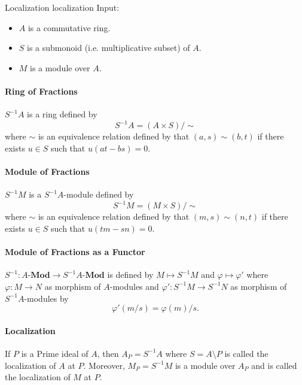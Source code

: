 \documentclass{article}
\begin{document}
\begin{definition}{Localization }{localization}
    Input:
    \begin{itemize}
        \item $A$ is a commutative ring.
        \item $S$ is a submonoid (i.e. multiplicative subset) of $A$.
        \item $M$ is a module over $A$.
    \end{itemize}
    \paragraph*{Ring of Fractions}
    $S^{-1}A$ is a ring defined by
    \[ S^{-1} A = (A\times S)/\sim \]
    where $\sim$ is an equivalence relation defined by that $(a,s) \sim (b,t)$ if there exists $u\in S$ such that $u(at - bs) = 0$.
    \paragraph*{Module of Fractions}
    $S^{-1}M$ is a $S^{-1}A$-module defined by
    \[ S^{-1}M = (M\times S) / \sim \]
    where $\sim$ is an equivalence relation defined by that $(m,s)\sim (n,t)$ if there exists $u\in S$ such that $u(tm - sn) = 0$.
    \paragraph*{Module of Fractions as a Functor}
    $S^{-1}:A\text{-}\mathbf{Mod} \rightarrow S^{-1}A\text{-}\mathbf{Mod}$ is defined by $M\mapsto S^{-1}M$ and $\varphi\mapsto \varphi'$ where $\varphi: M\rightarrow N$ as morphism of $A$-modules and $\varphi':S^{-1}M\rightarrow S^{-1}N$ as morphism of $S^{-1}A$-modules by
    \[ \varphi'(m/s) = \varphi(m)/s. \]
    \paragraph*{Localization}
    If $P$ is a Prime ideal of $A$, then $A_P = S^{-1}A$ where $S = A \setminus P$ is called the localization of $A$ at $P$.
    Moreover, $M_P = S^{-1}M$ is a module over $A_P$ and is called the localization of $M$ at $P$.
\end{definition}
\end{document}
